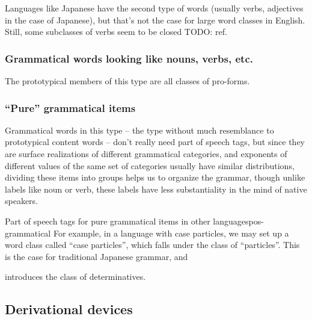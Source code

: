 \documentclass[UTF8, a4paper, oneside, scheme=plain]{ctexrep}
\newcommand*{\citepage}[1]{pp.~{#1}}
\begin{document}
Languages like Japanese have the second type of words 
(usually verbs, adjectives in the case of Japanese),
but that's not the case for large word classes in English.
Still, some subclasses of verbs seem to be closed TODO: ref.

\subsubsection{Grammatical words looking like nouns, verbs, etc.}

The prototypical members of this type are all classes of pro-forms.

\subsubsection{``Pure'' grammatical items}

Grammatical words in this type -- the type without much resemblance to prototypical content words -- 
don't really need part of speech tags,
but since they are surface realizations of different grammatical categories,
and exponents of different values of the same set of categories 
usually have similar distributions,
dividing these items into groups helps us to organize the grammar,
though unlike labels like noun or verb,
these labels have less substantiality in the mind of native speakers.

\begin{infobox}{Part of speech tags for pure grammatical items in other languages}{pos-grammatical}
    For example, in a language with case particles,
    we may set up a word class called ``case particles'',
    which falls under the class of ``particles''.
    This is the case for traditional Japanese grammar,
    and 
\end{infobox}

\citet[\citepage{330}]{cgel} introduces the class of determinatives.

\subsection{Derivational devices}
\end{document}
